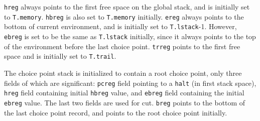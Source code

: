 \documentclass[11pt]{article}
\begin{document}
{\tt hreg} always points to the first free space on the global stack,
and is initially set to {\tt T.memory}.  {\tt hbreg} is also set to
{\tt T.memory} initially.  {\tt ereg} always points to the bottom of
current environment, and is initially set to {\tt T.lstack}-1.
However, {\tt ebreg} is set to be the same as {\tt T.lstack}
initially, since it always points to the top of the environment before
the last choice point.  {\tt trreg} points to the first free space and
is initially set to {\tt T.trail}.

The choice point stack is initialized to contain a root choice point,
only three fields of which are significant: {\tt pcreg} field pointing
to a {\tt halt} (in first stack space), {\tt hreg} field containing
initial {\tt hbreg} value, and {\tt ebreg} field containing the
initial {\tt ebreg} value.  The last two fields are used for cut.
{\tt breg} points to the bottom of the last choice point record, and
points to the root choice point initially.
\end{document}

